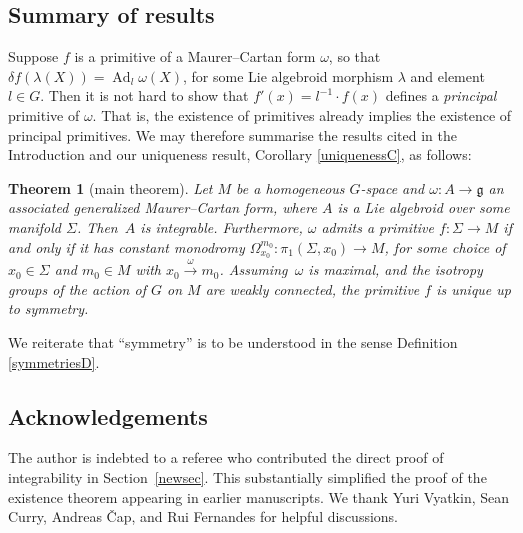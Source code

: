 \documentclass[pdftex]{sigma}%
\numberwithin{equation}{section}
\newtheorem{Theorem}{Theorem}[section]
\DeclareMathOperator{\Adjoint}{Ad}
\begin{document}
\subsection*{Summary of results}

Suppose $f$ is a primitive of a Maurer--Cartan form $\omega $, so that
$\delta f (\lambda(X))=\Adjoint_l \omega(X)$, for some Lie algebroid
morphism $\lambda $ and element $l \in G$. Then it is not hard to show
that $f'(x)=l^{-1} \cdot f(x)$ defines a {\em principal} primitive of
$\omega $. That is, the existence of primitives already implies the
existence of principal primitives. We may therefore summarise the
results cited in the Introduction and our uniqueness result, Corollary
\ref{uniquenessC}, as follows:

\begin{Theorem}[main theorem]\label{summaryT}
 Let $M$ be a homogeneous $G$-space and
 $\omega \colon A \rightarrow {\mathfrak g} $ an associated
 generalized Maurer--Cartan form, where $A$ is a Lie algebroid over
 some manifold $\Sigma $. Then~$A$ is integrable. Furthermore,
 $\omega $ admits a primitive $f \colon \Sigma \rightarrow M$ if and
 only if it has constant monodromy
 $\Omega_{x_0}^{m_0} \colon \pi_1(\Sigma, x_0) \rightarrow M$, for
 some choice of $x_0 \in \Sigma $ and $m_0 \in M$ with
 $x_0\xrightarrow{\omega}m_0$. Assu\-ming~$\omega $ is maximal, and the isotropy groups of the action of $G$ on $M$ are weakly
 connected, the primitive $f$ is unique up to symmetry.
\end{Theorem}

We reiterate that ``symmetry'' is to be understood in the sense Definition \ref{symmetriesD}.

\subsection*{Acknowledgements} The author is indebted to a referee who
contributed the direct proof of integrability in Section~\ref{newsec}. This substantially simplified the proof of the existence
theorem appearing in earlier manuscripts. We thank Yuri Vyatkin, Sean
Curry, Andreas \v{C}ap, and Rui Fernandes for helpful discussions.
\end{document}
